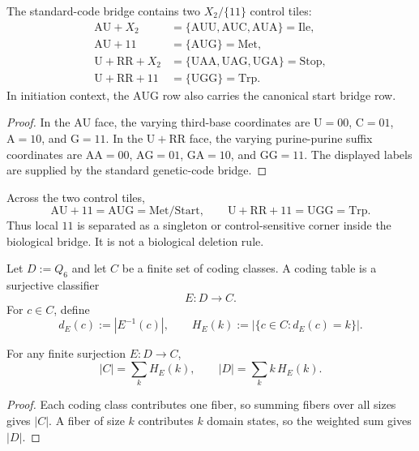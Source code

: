 \begin{theorem}
\label{thm:philosophy-spectral-inverse-dual-control-tiles}
The standard-code bridge contains two $X_{2}/\{11\}$ control tiles:
$$
\begin{aligned}
  \mathrm{AU}+X_{2}
    &=\{\mathrm{AUU},\mathrm{AUC},\mathrm{AUA}\}=\mathrm{Ile},\\
  \mathrm{AU}+11
    &=\{\mathrm{AUG}\}=\mathrm{Met},\\
  \mathrm{U}+\mathrm{RR}+X_{2}
    &=\{\mathrm{UAA},\mathrm{UAG},\mathrm{UGA}\}=\mathrm{Stop},\\
  \mathrm{U}+\mathrm{RR}+11
    &=\{\mathrm{UGG}\}=\mathrm{Trp}.
\end{aligned}
$$
In initiation context, the $\mathrm{AUG}$ row also carries the canonical
start bridge row.
\end{theorem}
\begin{proof}
In the $\mathrm{AU}$ face, the varying third-base coordinates are
$\mathrm{U}=00$, $\mathrm{C}=01$, $\mathrm{A}=10$, and
$\mathrm{G}=11$. In the $\mathrm{U}+\mathrm{RR}$ face, the varying
purine-purine suffix coordinates are $\mathrm{AA}=00$,
$\mathrm{AG}=01$, $\mathrm{GA}=10$, and $\mathrm{GG}=11$. The displayed
labels are supplied by the standard genetic-code bridge.
\end{proof}

\begin{corollary}
\label{cor:philosophy-spectral-inverse-local-eleven-reserved}
Across the two control tiles,
$$
  \mathrm{AU}+11=\mathrm{AUG}=\mathrm{Met}/\mathrm{Start},
  \qquad
  \mathrm{U}+\mathrm{RR}+11=\mathrm{UGG}=\mathrm{Trp}.
$$
Thus local $11$ is separated as a singleton or control-sensitive corner
inside the biological bridge. It is not a biological deletion rule.
\end{corollary}

\begin{definition}
\label{def:philosophy-spectral-inverse-classifier-histogram}
Let $D:=Q_{6}$ and let $C$ be a finite set of coding classes. A coding
table is a surjective classifier
$$
  E:D\to C.
$$
For $c\in C$, define
$$
  d_{E}(c):=|E^{-1}(c)|,
  \qquad
  H_{E}(k):=|\{c\in C:d_{E}(c)=k\}|.
$$
\end{definition}

\begin{theorem}
\label{thm:philosophy-global-histogram-identities}
For any finite surjection $E:D\to C$,
$$
  |C|=\sum_{k}H_{E}(k),
  \qquad
  |D|=\sum_{k}k\,H_{E}(k).
$$
\end{theorem}
\begin{proof}
Each coding class contributes one fiber, so summing fibers over all sizes
gives $|C|$. A fiber of size $k$ contributes $k$ domain states, so the
weighted sum gives $|D|$.
\end{proof}

